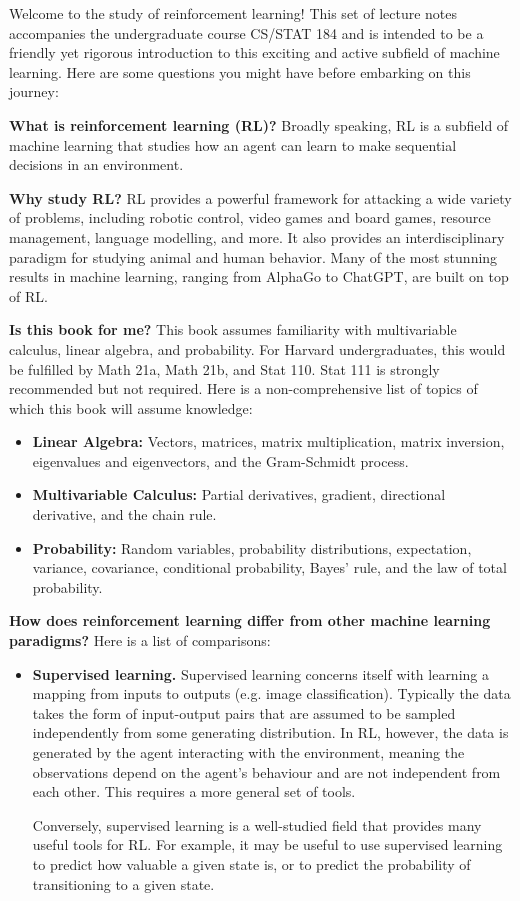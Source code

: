 \documentclass[\main/main]{subfiles}
\begin{document}
Welcome to the study of reinforcement learning! This set of lecture notes accompanies the undergraduate course CS/STAT 184 and is intended to be a friendly yet rigorous introduction to this exciting and active subfield of machine learning. Here are some questions you might have before embarking on this journey:

\textbf{What is reinforcement learning (RL)?} Broadly speaking, RL is a subfield of machine learning that studies how an agent can learn to make sequential decisions in an environment.

\textbf{Why study RL?} RL provides a powerful framework for attacking a wide variety of problems, including robotic control, video games and board games, resource management, language modelling, and more. It also provides an interdisciplinary paradigm for studying animal and human behavior. Many of the most stunning results in machine learning, ranging from AlphaGo to ChatGPT, are built on top of RL.

\textbf{Is this book for me?} This book assumes familiarity with multivariable calculus, linear algebra, and probability. For Harvard undergraduates, this would be fulfilled by Math 21a, Math 21b, and Stat 110. Stat 111 is strongly recommended but not required. Here is a non-comprehensive list of topics of which this book will assume knowledge:

\begin{itemize}
    \item \textbf{Linear Algebra:} Vectors, matrices, matrix multiplication, matrix inversion, eigenvalues and eigenvectors, and the Gram-Schmidt process.
    \item \textbf{Multivariable Calculus:} Partial derivatives, gradient, directional derivative, and the chain rule.
    \item \textbf{Probability:} Random variables, probability distributions, expectation, variance, covariance, conditional probability, Bayes' rule, and the law of total probability.
\end{itemize}

\textbf{How does reinforcement learning differ from other machine learning paradigms?} Here is a list of comparisons:

\begin{itemize}
    \item \textbf{Supervised learning.} Supervised learning concerns itself with learning a mapping from inputs to outputs (e.g. image classification). Typically the data takes the form of input-output pairs that are assumed to be sampled independently from some generating distribution. In RL, however, the data is generated by the agent interacting with the environment, meaning the observations depend on the agent's behaviour and are not independent from each other. This requires a more general set of tools.

    Conversely, supervised learning is a well-studied field that provides many useful tools for RL. For example, it may be useful to use supervised learning to predict how valuable a given state is, or to predict the probability of transitioning to a given state.
\end{itemize}
\end{document}
